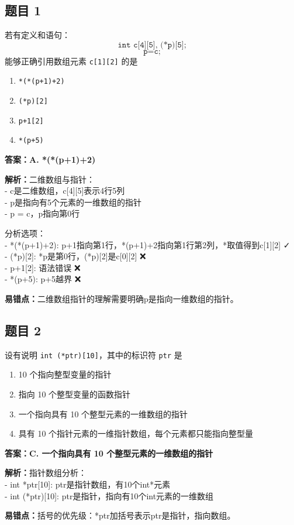\documentclass[12pt,a4paper]{ctexart}
\begin{document}
\subsection*{题目 1}
若有定义和语句：
\[
	\texttt{int c[4][5], (*p)[5];}
\]
\[
	\texttt{p=c;}
\]
能够正确引用数组元素 \texttt{c[1][2]} 的是
\begin{enumerate}[label=\Alph*.]
	\item \texttt{*(*(p+1)+2)}
	\item \texttt{(*p)[2]}
	\item \texttt{p+1[2]}
	\item \texttt{*(p+5)}
\end{enumerate}

\begin{answerbox}
	\textbf{答案：A. *(*(p+1)+2)}

	\textbf{解析：}二维数组与指针：\\
	- c是二维数组，c[4][5]表示4行5列\\
	- p是指向有5个元素的一维数组的指针\\
	- p = c，p指向第0行

	分析选项：\\
	- *(*(p+1)+2): p+1指向第1行，*(p+1)+2指向第1行第2列，*取值得到c[1][2] ✓\\
	- (*p)[2]: *p是第0行，(*p)[2]是c[0][2] ❌\\
	- p+1[2]: 语法错误 ❌\\
	- *(p+5): p+5越界 ❌

	\textbf{易错点：}二维数组指针的理解需要明确p是指向一维数组的指针。
\end{answerbox}

\subsection*{题目 2}
设有说明 \texttt{int (*ptr)[10]}，其中的标识符 \texttt{ptr} 是
\begin{enumerate}[label=\Alph*.]
	\item 10 个指向整型变量的指针
	\item 指向 10 个整型变量的函数指针
	\item 一个指向具有 10 个整型元素的一维数组的指针
	\item 具有 10 个指针元素的一维指针数组，每个元素都只能指向整型量
\end{enumerate}

\begin{answerbox}
	\textbf{答案：C. 一个指向具有 10 个整型元素的一维数组的指针}

	\textbf{解析：}指针数组分析：\\
	- int *ptr[10]: ptr是指针数组，有10个int*元素\\
	- int (*ptr)[10]: ptr是指针，指向有10个int元素的一维数组

	\textbf{易错点：}括号的优先级：*ptr加括号表示ptr是指针，指向数组。
\end{answerbox}
\end{document}
